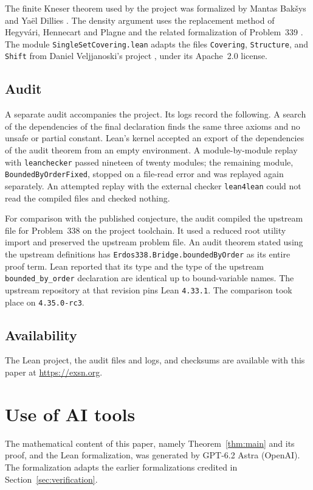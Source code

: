 \documentclass[11pt,reqno]{amsart}
\theoremstyle{definition}
\theoremstyle{remark}
\newcommand{\lean}[1]{\nolinkurl{#1}}
\begin{document}
The finite Kneser theorem used by the project was formalized by Mantas Bak\v{s}ys and Ya\"el Dillies \cite{MiscYD}. The density argument uses the replacement method of Hegyv\'ari, Hennecart and Plagne and the related formalization of Problem~339 \cite{HHP03,Plby}. The module \lean{SingleSetCovering.lean} adapts the files \lean{Covering}, \lean{Structure}, and \lean{Shift} from Daniel Veljjanoski's project \cite{Vel26}, under its Apache~2.0 license.

\subsection{Audit}
A separate audit accompanies the project. Its logs record the following. A search of the dependencies of the final declaration finds the same three axioms and no unsafe or partial constant. Lean's kernel accepted an export of the dependencies of the audit theorem from an empty environment. A module-by-module replay with \lean{leanchecker} passed nineteen of twenty modules; the remaining module, \lean{BoundedByOrderFixed}, stopped on a file-read error and was replayed again separately. An attempted replay with the external checker \lean{lean4lean} could not read the compiled files and checked nothing.

For comparison with the published conjecture, the audit compiled the upstream file for Problem~338 \cite{FormalConj} on the project toolchain. It used a reduced root utility import and preserved the upstream problem file. An audit theorem stated using the upstream definitions has \lean{Erdos338.Bridge.boundedByOrder} as its entire proof term. Lean reported that its type and the type of the upstream \lean{bounded_by_order} declaration are identical up to bound-variable names. The upstream repository at that revision pins Lean \lean{4.33.1}. The comparison took place on \lean{4.35.0-rc3}.

\subsection{Availability}
The Lean project, the audit files and logs, and checksums are available with this paper at \url{https://exsn.org}.

\section*{Use of AI tools}
The mathematical content of this paper, namely Theorem~\ref{thm:main} and its proof, and the Lean formalization, was generated by GPT-6.2 Astra (OpenAI). The formalization adapts the earlier formalizations credited in Section~\ref{sec:verification}.
\end{document}
